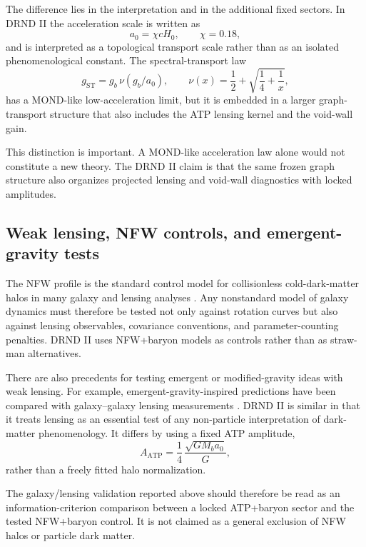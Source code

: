 \documentclass[12pt]{iopart}
\begin{document}
The difference lies in the interpretation and in the additional fixed sectors. In DRND II the acceleration scale is written as
\begin{equation}
a_0=\chi cH_0,
\qquad \chi=0.18,
\end{equation}
and is interpreted as a topological transport scale rather than as an isolated phenomenological constant. The spectral-transport law
\begin{equation}
g_{\mathrm{ST}}
=
g_b\,\nu(g_b/a_0),
\qquad
\nu(x)=\frac12+\sqrt{\frac14+\frac1x},
\end{equation}
has a MOND-like low-acceleration limit, but it is embedded in a larger graph-transport structure that also includes the ATP lensing kernel and the void-wall gain.

This distinction is important. A MOND-like acceleration law alone would not constitute a new theory. The DRND II claim is that the same frozen graph structure also organizes projected lensing and void-wall diagnostics with locked amplitudes.

\subsection{Weak lensing, NFW controls, and emergent-gravity tests}

The NFW profile is the standard control model for collisionless cold-dark-matter halos in many galaxy and lensing analyses \cite{Navarro1996,Navarro1997}. Any nonstandard model of galaxy dynamics must therefore be tested not only against rotation curves but also against lensing observables, covariance conventions, and parameter-counting penalties. DRND II uses NFW+baryon models as controls rather than as straw-man alternatives.

There are also precedents for testing emergent or modified-gravity ideas with weak lensing. For example, emergent-gravity-inspired predictions have been compared with galaxy--galaxy lensing measurements \cite{Brouwer2017}. DRND II is similar in that it treats lensing as an essential test of any non-particle interpretation of dark-matter phenomenology. It differs by using a fixed ATP amplitude,
\begin{equation}
A_{\mathrm{ATP}}
=
\frac14\,\frac{\sqrt{GM_ba_0}}{G},
\end{equation}
rather than a freely fitted halo normalization.

The galaxy/lensing validation reported above should therefore be read as an information-criterion comparison between a locked ATP+baryon sector and the tested NFW+baryon control. It is not claimed as a general exclusion of NFW halos or particle dark matter.
\end{document}
